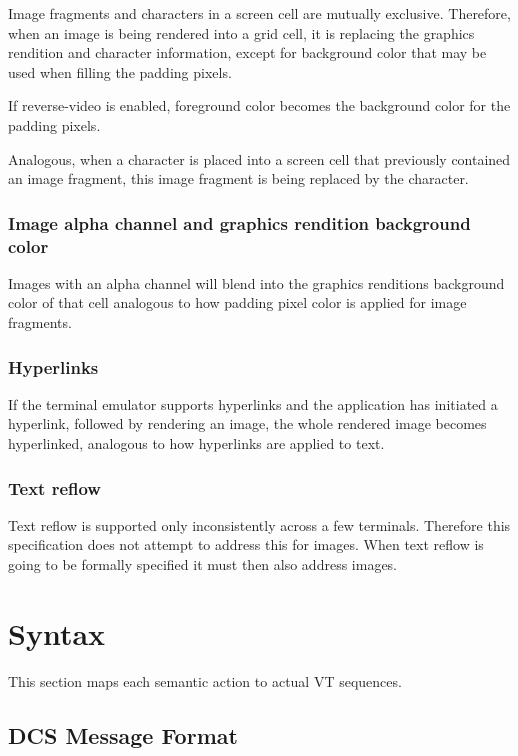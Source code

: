 \documentclass[a4paper]{article}
\begin{document}
Image fragments and characters in a screen cell are mutually exclusive.
Therefore, when an image is being rendered into a grid cell, it is replacing the graphics rendition and
character information, except for background color that may be used when filling the padding pixels.

If reverse-video is enabled, foreground color becomes the background color for the padding pixels.

Analogous, when a character is placed into a screen cell that previously contained an image
fragment, this image fragment is being replaced by the character.

\subsubsection*{Image alpha channel and graphics rendition background color}

Images with an alpha channel will blend into the graphics renditions background color of that cell
analogous to how padding pixel color is applied for image fragments.

\subsubsection*{Hyperlinks}

If the terminal emulator supports hyperlinks and the application has initiated a hyperlink, followed
by rendering an image, the whole rendered image becomes hyperlinked, analogous to how hyperlinks
are applied to text.

\subsubsection*{Text reflow}

Text reflow is supported only inconsistently across a few terminals. Therefore this
specification does not attempt to address this for images. When text reflow is going to
be formally specified it must then also address images.

\section{Syntax} %

This section maps each semantic action to actual VT sequences.

\subsection{DCS Message Format}
\end{document}
